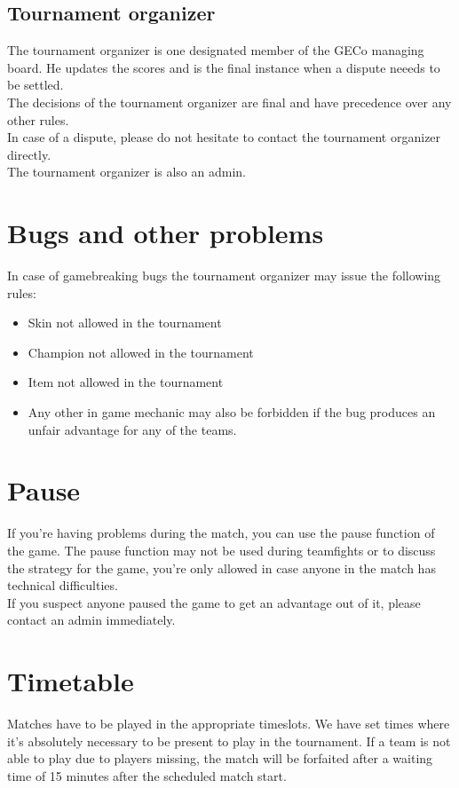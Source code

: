 \documentclass{article}
\begin{document}
\subsection{Tournament organizer}
The tournament organizer is one designated member of the GECo managing board. He updates the scores and is the final instance when a dispute neeeds to be settled.
\\
The decisions of the tournament organizer are final and have precedence over any other rules.
\\
In case of a dispute, please do not hesitate to contact the tournament organizer directly.
\\
The tournament organizer is also an admin.

\section{Bugs and other problems}
In case of gamebreaking bugs the tournament organizer may issue the following rules:
\begin{itemize}
	\item Skin not allowed in the tournament
	\item Champion not allowed in the tournament
	\item Item not allowed in the tournament
	\item Any other in game mechanic may also be forbidden if the bug produces an unfair advantage for any of the teams.
\end{itemize}

\section{Pause}
If you're having problems during the match, you can use the pause function of the game. The pause function may not be used during teamfights or to discuss the strategy for the game, you're only allowed in case anyone in the match has technical difficulties.
\\
If you suspect anyone paused the game to get an advantage out of it, please contact an admin immediately.

\section{Timetable}
Matches have to be played in the appropriate timeslots. We have set times where it's absolutely necessary to be present to play in the tournament. If a team is not able to play due to players missing, the match will be forfaited after a waiting time of 15 minutes after the scheduled match start.
\end{document}
